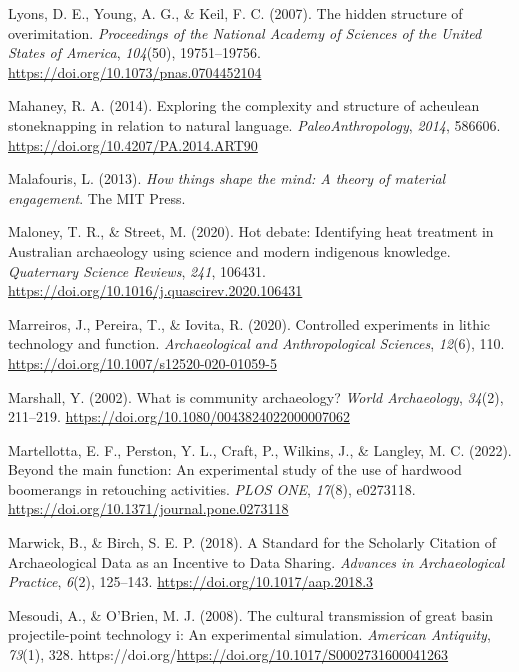 \documentclass[
  11pt,
  letterpaper,
  DIV=11,
  numbers=noendperiod]{scrartcl}
\newlength{\cslhangindent}
\newenvironment{CSLReferences}[2] %
 {\begin{list}{}{%
  \setlength{\itemindent}{0pt}
  \setlength{\leftmargin}{0pt}
  \setlength{\parsep}{0pt}
  \ifodd #1
   \setlength{\leftmargin}{\cslhangindent}
   \setlength{\itemindent}{-1\cslhangindent}
  \fi
  \setlength{\itemsep}{#2\baselineskip}}}
 {\end{list}}
\begin{document}
\begin{CSLReferences}{1}{0}
Lyons, D. E., Young, A. G., \& Keil, F. C. (2007). The hidden structure
of overimitation. \emph{Proceedings of the National Academy of Sciences
of the United States of America}, \emph{104}(50), 19751--19756.
\url{https://doi.org/10.1073/pnas.0704452104}

Mahaney, R. A. (2014). Exploring the complexity and structure of
acheulean stoneknapping in relation to natural language.
\emph{PaleoAnthropology}, \emph{2014}, 586606.
\url{https://doi.org/10.4207/PA.2014.ART90}

Malafouris, L. (2013). \emph{How things shape the mind: A theory of
material engagement}. The MIT Press.

Maloney, T. R., \& Street, M. (2020). Hot debate: Identifying heat
treatment in Australian archaeology using science and modern indigenous
knowledge. \emph{Quaternary Science Reviews}, \emph{241}, 106431.
\url{https://doi.org/10.1016/j.quascirev.2020.106431}

Marreiros, J., Pereira, T., \& Iovita, R. (2020). Controlled experiments
in lithic technology and function. \emph{Archaeological and
Anthropological Sciences}, \emph{12}(6), 110.
\url{https://doi.org/10.1007/s12520-020-01059-5}

Marshall, Y. (2002). What is community archaeology? \emph{World
Archaeology}, \emph{34}(2), 211--219.
\url{https://doi.org/10.1080/0043824022000007062}

Martellotta, E. F., Perston, Y. L., Craft, P., Wilkins, J., \& Langley,
M. C. (2022). Beyond the main function: An experimental study of the use
of hardwood boomerangs in retouching activities. \emph{PLOS ONE},
\emph{17}(8), e0273118.
\url{https://doi.org/10.1371/journal.pone.0273118}

Marwick, B., \& Birch, S. E. P. (2018). A Standard for the Scholarly
Citation of Archaeological Data as an Incentive to Data Sharing.
\emph{Advances in Archaeological Practice}, \emph{6}(2), 125--143.
\url{https://doi.org/10.1017/aap.2018.3}

Mesoudi, A., \& O'Brien, M. J. (2008). The cultural transmission of
great basin projectile-point technology i: An experimental simulation.
\emph{American Antiquity}, \emph{73}(1), 328.
https://doi.org/\url{https://doi.org/10.1017/S0002731600041263}


\end{CSLReferences}
\end{document}
